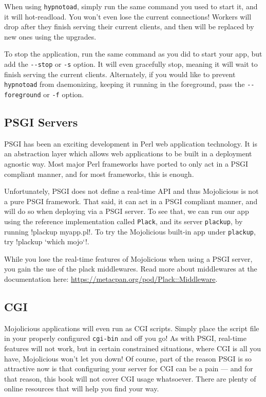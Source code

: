When using \verb!hypnotoad!, simply run the same command you used to start it, and it will hot-readload.
You won't even lose the current connections!
Workers will drop after they finish serving their current clients, and then will be replaced by new ones using the upgrades.

To stop the application, run the same command as you did to start your app, but add the \verb!--stop! or \verb!-s! option.
It will even gracefully stop, meaning it will wait to finish serving the current clients.
Alternately, if you would like to prevent \verb!hypnotoad! from daemonizing, 
keeping it running in the foreground, pass the \verb!--foreground! or \verb!-f! option.


\subsection{PSGI Servers}

PSGI has been an exciting development in Perl web application technology.
It is an abstraction layer which allows web applications to be built in a deployment agnostic way.
Most major Perl frameworks have ported to only act in a PSGI compliant manner, and for most frameworks, this is enough.

Unfortunately, PSGI does not define a real-time API and thus Mojolicious is not a pure PSGI framework.
That said, it can act in a PSGI compliant manner, and will do so when deploying via a PSGI server.
To see that, we can run our app using the reference implementation called \verb!Plack!, and its server \verb!plackup!, by running \lstbash!plackup myapp.pl!.
To try the Mojolicious built-in app under \verb!plackup!, try \lstbash!plackup `which mojo`!.

While you lose the real-time features of Mojolicious when using a PSGI server, you gain the use of the plack middlewares.
Read more about middlewares at the documentation here: \url{https://metacpan.org/pod/Plack::Middleware}.

\subsection{CGI}

Mojolicious applications will even run as CGI scripts.
Simply place the script file in your properly configured \verb!cgi-bin! and off you go!
As with PSGI, real-time features will not work, but in certain constrained situations, where CGI is all you have, Mojolicious won't let you down!
Of course, part of the reason PSGI is so attractive now is that configuring your server for CGI can be a pain ---
and for that reason, this book will not cover CGI usage whatsoever.
There are plenty of online resources that will help you find your way.

